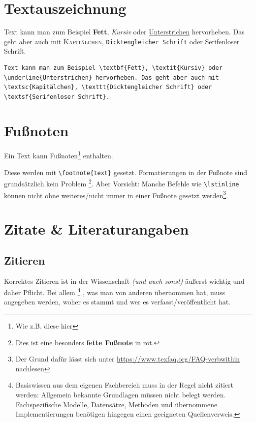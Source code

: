 	\section{Textauszeichnung}
		\begin{vorlagenbeispiel}
			Text kann man zum Beispiel \textbf{Fett}, \textit{Kursiv} oder \underline{Unterstrichen} hervorheben. Das geht aber auch mit \textsc{Kapitälchen}, \texttt{Dicktengleicher Schrift} oder \textsf{Serifenloser Schrift}.
		\end{vorlagenbeispiel}
		\begin{lstlisting}[keywords={textbf, textit, underline, textsc, texttt, textsf}]
Text kann man zum Beispiel \textbf{Fett}, \textit{Kursiv} oder \underline{Unterstrichen} hervorheben. Das geht aber auch mit \textsc{Kapitälchen}, \texttt{Dicktengleicher Schrift} oder \textsf{Serifenloser Schrift}.
		\end{lstlisting}
					
	\section{Fußnoten}
		\begin{vorlagenbeispiel}
		Ein Text kann Fußnoten\footnote{Wie z.B. diese hier} enthalten.
		\end{vorlagenbeispiel}
		Diese werden mit \lstinline|\footnote{text}| gesetzt. Formatierungen in der Fußnote sind grundsätzlich kein Problem%
		\footnote{%
			\color{red}Dies ist eine besonders \textbf{fette Fußnote} in rot.
		}.
%		
		Aber Vorsicht: Manche Befehle wie \zb \lstinline|\lstinline| können nicht ohne weiteres/nicht immer in einer Fußnote gesetzt werden\footnote{Der Grund dafür lässt sich unter \url{https://www.texfaq.org/FAQ-verbwithin} nachlesen}.
	
	\section{Zitate \& Literaturangaben}
		\subsection{Zitieren}
			Korrektes Zitieren ist in der Wissenschaft \emph{(und auch sonst)} äußerst wichtig und daher Pflicht.
%			
			Bei allem%
				\footnote{Basiswissen aus dem eigenen Fachbereich muss in der Regel nicht zitiert werden:
					Allgemein bekannte Grundlagen müssen nicht belegt werden.
					Fachspezifische Modelle, Datensätze, Methoden und übernommene Implementierungen benötigen hingegen einen geeigneten Quellenverweis.}%
			, was man von anderen übernommen hat, muss angegeben werden, woher es stammt und wer es verfasst/veröffentlicht hat.
				\medskip
					
